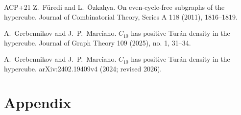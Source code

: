 \documentclass[11pt]{article}
\theoremstyle{plain}
\theoremstyle{definition}
\begin{document}
\begin{thebibliography}{ACP+21}
Z.~F\"uredi and L.~\"Ozkahya.
\newblock On even-cycle-free subgraphs of the hypercube.
Journal of Combinatorial Theory, Series A 118 (2011), 1816--1819.

A.~Grebennikov and J.~P.~Marciano.
\newblock $C_{10}$ has positive Tur\'an density in the hypercube.
Journal of Graph Theory 109 (2025), no. 1, 31--34.

A.~Grebennikov and J.~P.~Marciano.
\newblock $C_{10}$ has positive Tur\'an density in the hypercube.
arXiv:2402.19409v4 (2024; revised 2026).

\end{thebibliography}

\newpage

\appendix

\section{Appendix}
\end{document}
